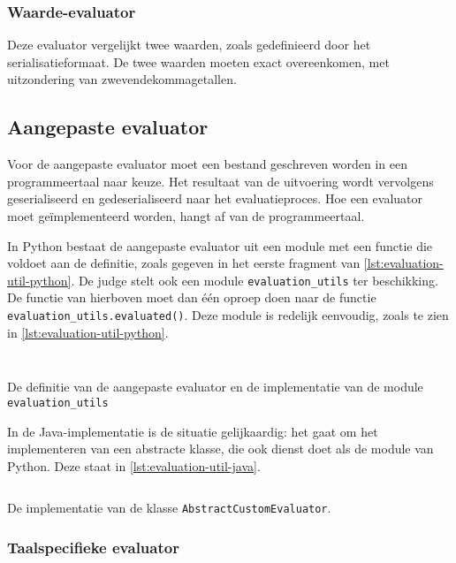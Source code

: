 \subsubsection{Waarde-evaluator}

Deze evaluator vergelijkt twee waarden, zoals gedefinieerd door het serialisatieformaat.
De twee waarden moeten exact overeenkomen, met uitzondering van zwevendekommagetallen.


\subsection{Aangepaste evaluator}\label{subsec:aangepaste-evaluator}

Voor de aangepaste evaluator moet een bestand geschreven worden in een programmeertaal naar keuze.
Het resultaat van de uitvoering wordt vervolgens geserialiseerd en gedeserialiseerd naar het evaluatieproces.
Hoe een evaluator moet geïmplementeerd worden, hangt af van de programmeertaal.

In Python bestaat de aangepaste evaluator uit een module met een functie die voldoet aan de definitie, zoals gegeven in het eerste fragment van \cref{lst:evaluation-util-python}.
De judge stelt ook een module \texttt{evaluation\_utils} ter beschikking.
De functie van hierboven moet dan één oproep doen naar de functie \texttt{evaluation\_utils.evaluated()}.
Deze module is redelijk eenvoudig, zoals te zien in \cref{lst:evaluation-util-python}.

\begin{listing}
    \inputminted{python}{code/signature.py}
    \inputminted{python}{../../judge/runners/templates/python/evaluation_utils.py}
    \caption{De definitie van de aangepaste evaluator en de implementatie van de module \texttt{evaluation\_utils}}
    \label{lst:evaluation-util-python}
\end{listing}

In de Java-implementatie is de situatie gelijkaardig: het gaat om het implementeren van een abstracte klasse, die ook dienst doet als de module van Python.
Deze staat in \cref{lst:evaluation-util-java}.

\begin{listing}
    \inputminted{java}{../../judge/runners/templates/java/AbstractCustomEvaluator.java}
    \caption{De implementatie van de klasse \texttt{AbstractCustomEvaluator}.}
    \label{lst:evaluation-util-java}
\end{listing}

\subsubsection{Taalspecifieke evaluator}

